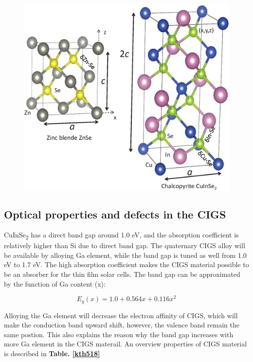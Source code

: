 \documentclass[a4paper, 12pt, titlepage,oneside,drop]{kthesis}
\begin{document}
\begin{figure}[H]
\centering
\includegraphics[scale=0.3]{structureciise.eps} 
\caption{}
\label{crystal_cigs}
\end{figure}






\subsection{Optical properties and defects in the CIGS}
CuInSe\textsubscript{2} has a direct band gap around 1.0 eV, and the absorption coefficient is relatively higher than Si due to direct band gap. The quaternary CIGS alloy will be available by alloying Ga element, while the band gap is tuned as well from 
1.0 eV to 1.7 eV. The high absorption coefficient makes the CIGS material possible to be an absorber for the thin film solar cells. The band gap can be approximated by the function of Ga content (x):

\begin{equation}
E_g(x) = 1.0 + 0.564x+0.116x^2
\end{equation}

Alloying the Ga element will decrease the electron affinity of CIGS, which will make the conduction band upward shift, however, the valence band remain the same postion. This also explains the reason why the band gap increases with 
more Ga element in the CIGS materail. An overview properties of CIGS material is described in \textbf{Table. \ref{kth518}} 
\end{document}
